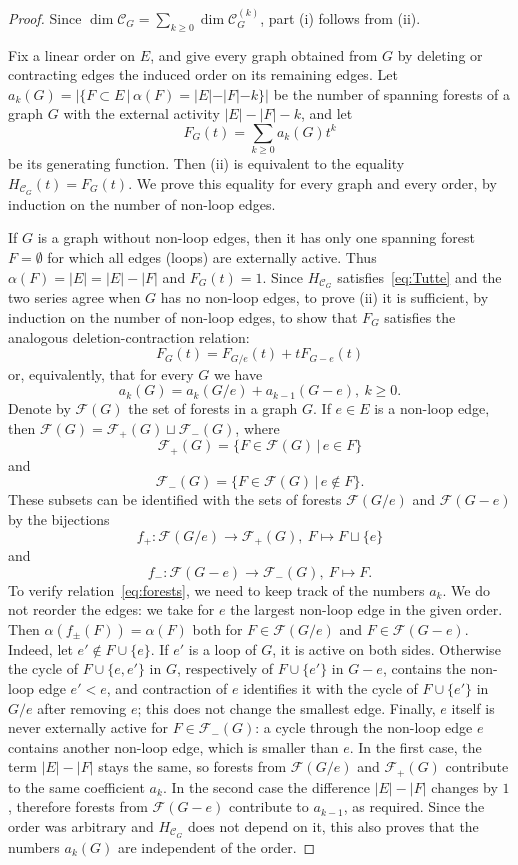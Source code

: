 \documentclass[reqno]{article}
\theoremstyle{plain} %
\theoremstyle{definition}
\theoremstyle{remark}
\newcommand {\CC}{\mathscr{C}}
\newcommand{\cF}{\mathscr{F}}
\newcommand{\ds}{\displaystyle}
\numberwithin{equation}{section}
\begin{document}
\begin{proof}
Since $\ds \dim \CC_G=\sum_{k\ge 0}\dim\CC_G^{(k)}$, part (i) follows from (ii).

Fix a linear order on $E$, and give every graph obtained from $G$ by deleting or contracting edges the induced order on its remaining edges. Let
$
a_k(G)=\bigl|\{F\subset E \,| \, \alpha(F)=|E|-|F|-k\}\bigr|
$
be the number of spanning forests of a graph $G$ with the external activity $|E|-|F|-k$, and let
 \[
F_G(t)=\sum_{k\ge 0} a_k(G)t^k
 \]
be its generating function. Then (ii) is equivalent to the equality
$H_{\CC_G}(t)=F_G(t)$. We prove this equality for every graph and every order, by induction on the number of non-loop edges.

If $G$ is a graph without non-loop edges, then it has only one spanning forest $F=\emptyset$ for which all edges (loops) are externally active. Thus $\alpha(F)=|E|=|E|-|F|$  and $F_G(t)=1$.
Since $H_{\CC_G}$ satisfies~\eqref{eq:Tutte} and the two series agree when $G$ has no non-loop edges, to prove (ii) it is sufficient, by induction on the number of non-loop edges, to show that $F_G$ satisfies the analogous deletion-contraction relation:
 \[
F_G(t)=F_{G/e}(t)+tF_{G-e}(t)
 \]
or, equivalently, that for every $G$ we have
\begin{equation}
  \label{eq:forests}
  a_k(G)=a_k(G/e)+a_{k-1}(G-e), \ k\ge 0.
\end{equation}
Denote by $\cF(G)$ the set of forests in a graph $G$.
If $e\in E$ is a non-loop edge, then $\cF(G)=\cF_+(G)\sqcup \cF_-(G)$,
where
 \[\cF_+(G)=\{F\in \cF(G) \,|\, e\in F\} \]
and
 \[\cF_-(G)=\{F\in \cF(G) \,|\, e\not\in F\}. \]
These subsets can be identified with the sets of forests $\cF(G/e)$ and $\cF(G-e)$ by the bijections
 \[
f_+\colon \cF(G/e) \to \cF_+(G), \ F\mapsto F\sqcup \{e\}
 \]
and
 \[
f_-\colon \cF(G-e) \to \cF_-(G), \ F\mapsto F.
 \]
To verify relation~\eqref{eq:forests}, we need to keep track of the numbers $a_k$. We do not reorder the edges: we take for $e$ the largest non-loop edge in the given order.
Then $\alpha(f_\pm(F))=\alpha(F)$ both for $F \in \cF(G/e)$ and $F \in \cF(G-e)$.  Indeed, let $e'\notin F\cup\{e\}$. If $e'$ is a loop of $G$, it is active on both sides. Otherwise the cycle of $F\cup\{e,e'\}$ in $G$, respectively of $F\cup\{e'\}$ in $G-e$, contains the non-loop edge $e'<e$, and contraction of $e$ identifies it with the cycle of $F\cup\{e'\}$ in $G/e$ after removing $e$; this does not change the smallest edge. Finally, $e$ itself is never externally active for $F\in\cF_-(G)$: a cycle through the non-loop edge $e$ contains another non-loop edge, which is smaller than $e$. In the first case, the term $|E|-|F|$ stays the same, so forests from $\cF(G/e)$ and $\cF_+(G)$ contribute to the same coefficient $a_k$. In the second case the difference $|E|-|F|$ changes by $1$, therefore forests from $\cF(G-e)$ contribute to $a_{k-1}$, as required.
Since the order was arbitrary and $H_{\CC_G}$ does not depend on it, this also proves that the numbers $a_k(G)$ are independent of the order.
\end{proof}
\end{document}
